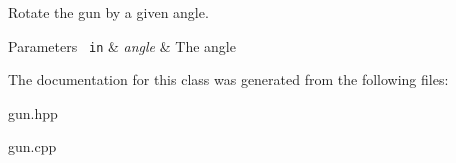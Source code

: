 Rotate the gun by a given angle. 


\begin{DoxyParams}[1]{Parameters}
\mbox{\texttt{ in}}  & {\em angle} & The angle \\
\hline
\end{DoxyParams}


The documentation for this class was generated from the following files\+:\begin{DoxyCompactItemize}
\item 
gun.\+hpp\item 
gun.\+cpp\end{DoxyCompactItemize}
